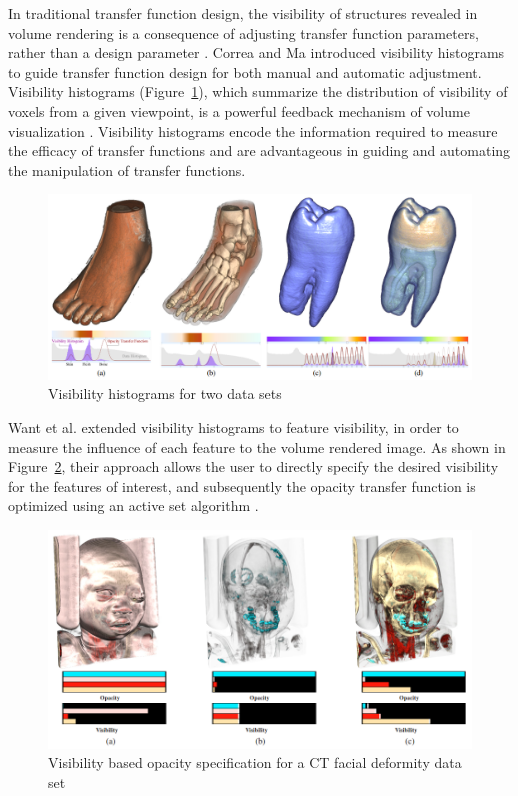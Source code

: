 In traditional transfer function design, the visibility of structures revealed in volume rendering is a consequence of adjusting transfer function parameters, rather than a design parameter \cite{preim_visual_2013}.
Correa and Ma \cite{correa_visibility-driven_2009} introduced visibility histograms to guide transfer function design for both manual and automatic adjustment.
Visibility histograms (Figure~\ref{fig:correa_visibility-driven_2009}), which summarize the distribution of visibility of voxels from a given viewpoint, is a powerful feedback mechanism of volume visualization \cite{emsenhuber_visibility_2008}.
Visibility histograms encode the information required to measure the efficacy of transfer functions and are advantageous in guiding and automating the manipulation of transfer functions.

\begin{figure}
	\centering
	\includegraphics[width=1\linewidth]{images/correa_visibility-driven_2009}
	\caption{Visibility histograms for two data sets \cite{correa_visibility-driven_2009}}
	\label{fig:correa_visibility-driven_2009}
\end{figure}

Want et al. \cite{wang_efficient_2011} extended visibility histograms to feature visibility, in order to measure the influence of each feature to the volume rendered image. As shown in Figure~\ref{fig:wang_efficient_2011}, their approach allows the user to directly specify the desired visibility for the features of interest, and subsequently the opacity transfer function is optimized using an active set algorithm \cite{polyak_conjugate_1969}.

\begin{figure}
	\centering
	\includegraphics[width=1\linewidth]{images/wang_efficient_2011}
	\caption{Visibility based opacity specification for a CT facial deformity data set \cite{wang_efficient_2011}}
	\label{fig:wang_efficient_2011}
\end{figure}

